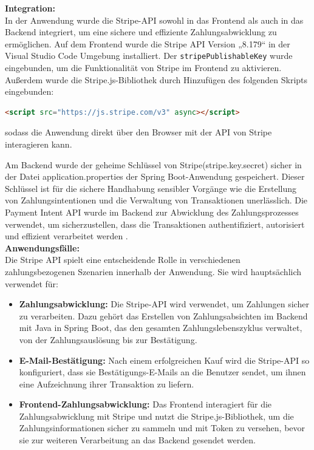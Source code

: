 \textbf{Integration:} \\


In der Anwendung wurde die Stripe-API sowohl in das Frontend als auch in das Backend integriert, um eine sichere und effiziente Zahlungsabwicklung zu ermöglichen. Auf dem Frontend wurde die Stripe API Version „8.179“ in der Visual Studio Code Umgebung installiert. Der \texttt{stripePublishableKey} wurde eingebunden, um die Funktionalität von Stripe im Frontend zu aktivieren. Außerdem wurde die Stripe.js-Bibliothek durch Hinzufügen des folgenden Skripts eingebunden:

\begin{lstlisting}[language=HTML, basicstyle=\ttfamily\small, frame=single, backgroundcolor=\color{lightgray}]
	<script src="https://js.stripe.com/v3" async></script>
\end{lstlisting}

sodass die Anwendung direkt über den Browser mit der API von Stripe interagieren kann.

Am Backend wurde der geheime Schlüssel von Stripe(stripe.key.secret) sicher in der Datei application.properties der Spring Boot-Anwendung gespeichert. Dieser Schlüssel ist für die sichere Handhabung sensibler Vorgänge wie die Erstellung von Zahlungsintentionen und die Verwaltung von Transaktionen unerlässlich. Die Payment Intent API wurde im Backend zur Abwicklung des Zahlungsprozesses verwendet, um sicherzustellen, dass die Transaktionen authentifiziert, autorisiert und effizient verarbeitet werden \cite{Stripe-Intents:o.J}. \\


\noindent\textbf{Anwendungsfälle:} \\


Die Stripe API spielt eine entscheidende Rolle in verschiedenen zahlungsbezogenen Szenarien innerhalb der Anwendung. Sie wird hauptsächlich verwendet für:
\begin{itemize}
	\item \textbf{Zahlungsabwicklung:} Die Stripe-API wird verwendet, um Zahlungen sicher zu verarbeiten. Dazu gehört das Erstellen von Zahlungsabsichten im Backend mit Java in Spring Boot, das den gesamten Zahlungslebenszyklus verwaltet, von der Zahlungsauslösung bis zur Bestätigung.
	
	\item \textbf{E-Mail-Bestätigung:} Nach einem erfolgreichen Kauf wird die Stripe-API so konfiguriert, dass sie Bestätigungs-E-Mails an die Benutzer sendet, um ihnen eine Aufzeichnung ihrer Transaktion zu liefern.
	
	\item \textbf{Frontend-Zahlungsabwicklung:} Das Frontend interagiert für die Zahlungsabwicklung mit Stripe und nutzt die Stripe.js-Bibliothek, um die Zahlungsinformationen sicher zu sammeln und mit Token zu versehen, bevor sie zur weiteren Verarbeitung an das Backend gesendet werden.
\end{itemize}

